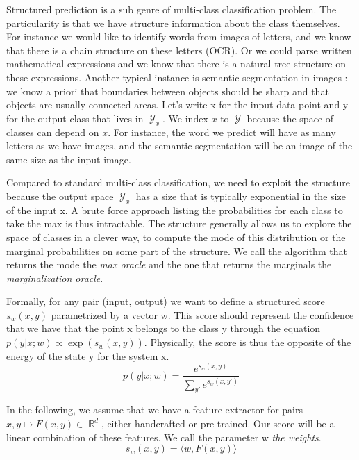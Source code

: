 \documentclass{article}
\DeclareMathOperator{\R}{\mathbb{R}}
\DeclareMathOperator{\1}{\mathbb{1}}
\DeclareMathOperator{\Y}{\mathcal{Y}}
\begin{document}
Structured prediction is a sub genre of multi-class classification problem.
The particularity is that we have structure information about the class themselves.
For instance we would like to identify words from images of letters, and we know that there is a chain structure on these letters (OCR).
Or we could parse written mathematical expressions and we know that there is a natural tree structure on these expressions.
Another typical instance is semantic segmentation in images : we know a priori that boundaries between objects should be sharp and that objects are usually connected areas.
Let's write x for the input data point and y for the output class that lives in $\Y_x$.
We index $x$ to $\Y$ because the space of classes can depend on $x$.
For instance, the word we predict will have as many letters as we have images, and the semantic segmentation will be an image of the same size as the input image. 

Compared to standard multi-class classification, we need to exploit the structure because the output space $\Y_x$ has a size that is typically exponential in the size of the input x.
A brute force approach listing the probabilities for each class to take the max is thus intractable.
The structure generally allows us to explore the space of classes in a clever way, to compute the mode of this distribution or the marginal probabilities on some part of the structure.
We call the algorithm that returns the mode the \textit{max oracle} and the one that returns the marginals the \textit{marginalization oracle}. 

Formally, for any pair (input, output) we want to define a structured score $s_w(x, y)$ parametrized by a vector w.
This score should represent the confidence that we have that the point x belongs to the class y through the equation $p(y|x ; w)\propto \exp(s_w(x, y))$.
Physically, the score  is thus the opposite of the energy of the state y for the system x. 
\begin{equation}
	p(y|x; w)=  \frac{e^{s_w(x, y)}}{\sum_{y'} e^{s_w(x, y')}}
\end{equation}

In the following, we assume that we have a feature extractor for pairs $x, y \mapsto F(x, y) \in \R^d$, either handcrafted or pre-trained.
Our score will be a linear combination of these features.
We call the parameter w \textit{the weights}.
\begin{equation}
	s_w(x, y) = \langle w, F(x, y) \rangle
\end{equation}
\end{document}
